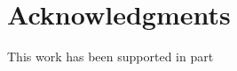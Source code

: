 \documentclass{sig-alternate}
\begin{document}


\section{Acknowledgments}
This work has been supported in part %

%



\end{document}
